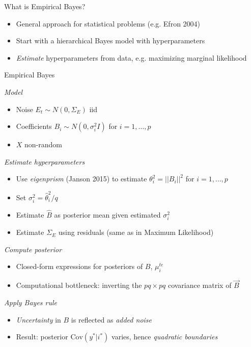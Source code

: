 \documentclass[final]{beamer}
\newlength{\onecolwid}
\begin{document}
\begin{frame}[t]
\begin{columns}[t]
\begin{column}{\onecolwid}
\begin{alertblock}{What is Empirical Bayes?}
\begin{itemize}
\item General approach for statistical problems (e.g. Efron 2004)
\item Start with a hierarchical Bayes model with hyperparameters
\item \emph{Estimate} hyperparameters from data, e.g. maximizing marginal likelihood
\end{itemize}
\end{alertblock}

\begin{block}{Empirical Bayes}

\emph{Model}

\begin{itemize}
\item Noise $E_t \sim N(0, \Sigma_E)$ iid 
\item Coefficients $B_i \sim N(0, \sigma^2_i I)$ for $i = 1, \hdots, p$
\item $X$ non-random
\end{itemize}

\emph{Estimate hyperparameters}

\begin{itemize}
\item Use \emph{eigenprism} (Janson 2015) to estimate $\theta_i^2 = ||B_i||^2$ for $i =1,\hdots, p$
\item Set $\sigma^2_i = \hat{\theta}_i^2/q$
\item Estimate $\hat{B}$ as posterior mean given estimated $\sigma^2_i$
\item Estimate $\Sigma_E$ using residuals (same as in Maximum Likelihood)
\end{itemize}

\emph{Compute posterior}
\begin{itemize}
\item Closed-form expressions for posteriors of $B$, $\mu_i^{te}$
\item Computational bottleneck: inverting the $pq \times pq$ covariance matrix of $\vec{B}$
\end{itemize}

\emph{Apply Bayes rule}

\begin{itemize}
\item \emph{Uncertainty} in $B$ is reflected as \emph{added noise}
\item Result: posterior $\text{Cov}(y^*|i^*)$ varies, hence \emph{quadratic boundaries}
\end{itemize}


\end{block}
\end{column}
\end{columns}
\end{frame}
\end{document}
